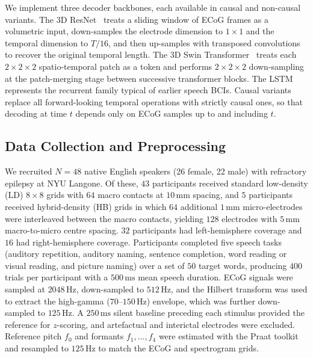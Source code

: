 \documentclass[11pt]{article}
\begin{document}
We implement three decoder backbones, each available in causal and
non-causal variants. The 3D ResNet~\cite{he2016deep} treats a sliding
window of ECoG frames as a volumetric input, down-samples the electrode
dimension to $1\times1$ and the temporal dimension to $T/16$, and then
up-samples with transposed convolutions to recover the original temporal
length. The 3D Swin Transformer~\cite{liu2021swin,liu2022video} treats
each $2\times2\times2$ spatio-temporal patch as a token and performs
$2\times2\times2$ down-sampling at the patch-merging stage between
successive transformer blocks. The LSTM~\cite{hochreiter1997lstm} represents
the recurrent family typical of earlier speech BCIs. Causal variants
replace all forward-looking temporal operations with strictly causal ones,
so that decoding at time $t$ depends only on ECoG samples up to and
including $t$.

\subsection{Data Collection and Preprocessing}

We recruited $N=48$ native English speakers (26 female, 22 male) with
refractory epilepsy at NYU Langone. Of these, $43$ participants received
standard low-density (LD) $8\times8$ grids with $64$ macro contacts at
$10\,\mathrm{mm}$ spacing, and $5$ participants received hybrid-density
(HB) grids in which $64$ additional $1\,\mathrm{mm}$ micro-electrodes were
interleaved between the macro contacts, yielding $128$ electrodes with
$5\,\mathrm{mm}$ macro-to-micro centre spacing. $32$ participants had
left-hemisphere coverage and $16$ had right-hemisphere coverage.
Participants completed five speech tasks (auditory repetition, auditory
naming, sentence completion, word reading or visual reading, and picture
naming) over a set of $50$ target words, producing $400$ trials per
participant with a $500\,\mathrm{ms}$ mean speech duration. ECoG signals
were sampled at $2048\,\mathrm{Hz}$, down-sampled to $512\,\mathrm{Hz}$,
and the Hilbert transform was used to extract the high-gamma
($70$--$150\,\mathrm{Hz}$) envelope, which was further down-sampled to
$125\,\mathrm{Hz}$. A $250\,\mathrm{ms}$ silent baseline preceding each
stimulus provided the reference for $z$-scoring, and artefactual and
interictal electrodes were excluded. Reference pitch $f_0$ and formants
$f_1,\dots,f_4$ were estimated with the Praat
toolkit~\cite{boersma2001praat} and resampled to $125\,\mathrm{Hz}$ to
match the ECoG and spectrogram grids.
\end{document}
